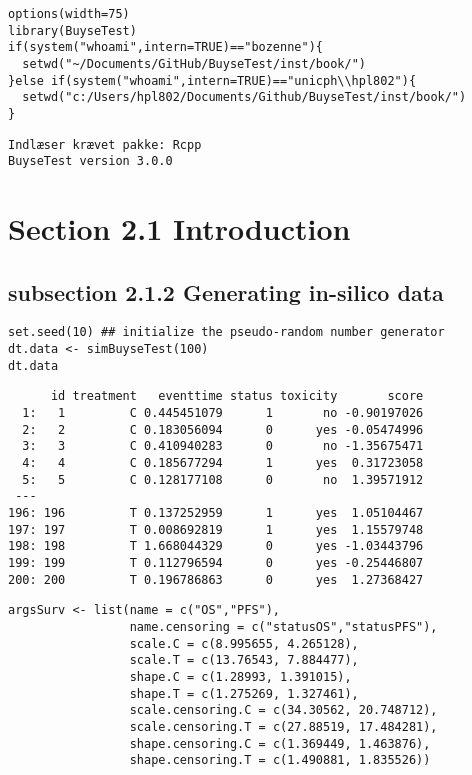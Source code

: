\documentclass[12pt]{article}
\date{\today}
\title{}
\begin{document}
\lstset{language=r,label= ,caption= ,captionpos=b,numbers=none}
\begin{lstlisting}
options(width=75)
library(BuyseTest)
if(system("whoami",intern=TRUE)=="bozenne"){
  setwd("~/Documents/GitHub/BuyseTest/inst/book/")
}else if(system("whoami",intern=TRUE)=="unicph\\hpl802"){
  setwd("c:/Users/hpl802/Documents/Github/BuyseTest/inst/book/")
}
\end{lstlisting}

\begin{verbatim}
Indlæser krævet pakke: Rcpp
BuyseTest version 3.0.0
\end{verbatim}

\section{Section 2.1 Introduction}
\label{sec:org2bb34d3}
\subsection{subsection 2.1.2 Generating in-silico data}
\label{sec:orge08694b}
\lstset{language=r,label= ,caption= ,captionpos=b,numbers=none}
\begin{lstlisting}
set.seed(10) ## initialize the pseudo-random number generator 
dt.data <- simBuyseTest(100)
dt.data
\end{lstlisting}

\begin{verbatim}
      id treatment   eventtime status toxicity       score
  1:   1         C 0.445451079      1       no -0.90197026
  2:   2         C 0.183056094      0      yes -0.05474996
  3:   3         C 0.410940283      0       no -1.35675471
  4:   4         C 0.185677294      1      yes  0.31723058
  5:   5         C 0.128177108      0       no  1.39571912
 ---                                                      
196: 196         T 0.137252959      1      yes  1.05104467
197: 197         T 0.008692819      1      yes  1.15579748
198: 198         T 1.668044329      0      yes -1.03443796
199: 199         T 0.112796594      0      yes -0.25446807
200: 200         T 0.196786863      0      yes  1.27368427
\end{verbatim}

\lstset{language=r,label= ,caption= ,captionpos=b,numbers=none}
\begin{lstlisting}
argsSurv <- list(name = c("OS","PFS"),
                 name.censoring = c("statusOS","statusPFS"),
                 scale.C = c(8.995655, 4.265128),
                 scale.T = c(13.76543, 7.884477),
                 shape.C = c(1.28993, 1.391015),
                 shape.T = c(1.275269, 1.327461),
                 scale.censoring.C = c(34.30562, 20.748712),
                 scale.censoring.T = c(27.88519, 17.484281),
                 shape.censoring.C = c(1.369449, 1.463876),
                 shape.censoring.T = c(1.490881, 1.835526))
\end{lstlisting}
\end{document}
